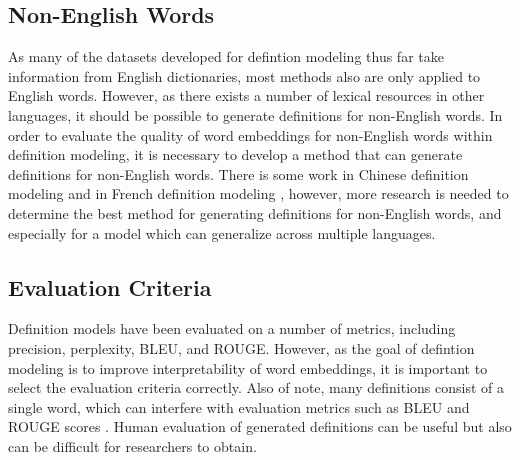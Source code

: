 \subsection{Non-English Words} As many of the datasets developed for defintion
modeling thus far take information from English dictionaries, most methods also
are only applied to English words. However, as there exists a number of lexical
resources in other languages, it should be possible to generate definitions for
non-English words. In order to evaluate the quality of word embeddings for
non-English words within definition modeling, it is necessary to develop a
method that can generate definitions for non-English words. There is some work
in Chinese definition modeling \cite{zheng_decompose_2021} and in French
definition modeling \cite{reid_vcdm_2020}, however, more research is needed to
determine the best method for generating definitions for non-English words, and
especially for a model which can generalize across multiple languages.

\subsection{Evaluation Criteria} Definition models have been evaluated on a
number of metrics, including precision, perplexity, BLEU, and ROUGE. However,
as the goal of defintion modeling is to improve interpretability of word
embeddings, it is important to select the evaluation criteria correctly. Also of
note, many definitions consist of a single word, which can interfere with
evaluation metrics such as BLEU and ROUGE scores \cite{mickus_mark_2019}. Human
evaluation of generated definitions can be useful but also can be difficult for
researchers to obtain.

